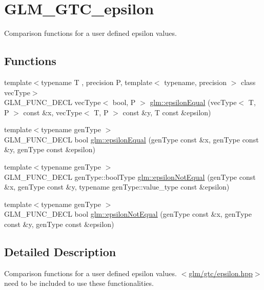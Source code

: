 \hypertarget{group__gtc__epsilon}{\section{G\-L\-M\-\_\-\-G\-T\-C\-\_\-epsilon}
\label{group__gtc__epsilon}
}


Comparison functions for a user defined epsilon values.  


\subsection*{Functions}
\begin{DoxyCompactItemize}
\item 
{\footnotesize template$<$typename T , precision P, template$<$ typename, precision $>$ class vec\-Type$>$ }\\G\-L\-M\-\_\-\-F\-U\-N\-C\-\_\-\-D\-E\-C\-L vec\-Type$<$ bool, P $>$ \hyperlink{group__gtc__epsilon_gaca9443f217dc36587624247245522331}{glm\-::epsilon\-Equal} (vec\-Type$<$ T, P $>$ const \&x, vec\-Type$<$ T, P $>$ const \&y, T const \&epsilon)
\item 
{\footnotesize template$<$typename gen\-Type $>$ }\\G\-L\-M\-\_\-\-F\-U\-N\-C\-\_\-\-D\-E\-C\-L bool \hyperlink{group__gtc__epsilon_gaa7f227999ca09e7ca994e8b35aba47bb}{glm\-::epsilon\-Equal} (gen\-Type const \&x, gen\-Type const \&y, gen\-Type const \&epsilon)
\item 
{\footnotesize template$<$typename gen\-Type $>$ }\\G\-L\-M\-\_\-\-F\-U\-N\-C\-\_\-\-D\-E\-C\-L gen\-Type\-::bool\-Type \hyperlink{group__gtc__epsilon_ga14e2888a304654ade8a3996024e2739c}{glm\-::epsilon\-Not\-Equal} (gen\-Type const \&x, gen\-Type const \&y, typename gen\-Type\-::value\-\_\-type const \&epsilon)
\item 
{\footnotesize template$<$typename gen\-Type $>$ }\\G\-L\-M\-\_\-\-F\-U\-N\-C\-\_\-\-D\-E\-C\-L bool \hyperlink{group__gtc__epsilon_ga50a92103fb0cbd796908e1bf20c79aaf}{glm\-::epsilon\-Not\-Equal} (gen\-Type const \&x, gen\-Type const \&y, gen\-Type const \&epsilon)
\end{DoxyCompactItemize}


\subsection{Detailed Description}
Comparison functions for a user defined epsilon values. $<$\hyperlink{gtc_2epsilon_8hpp}{glm/gtc/epsilon.\-hpp}$>$ need to be included to use these functionalities. 

